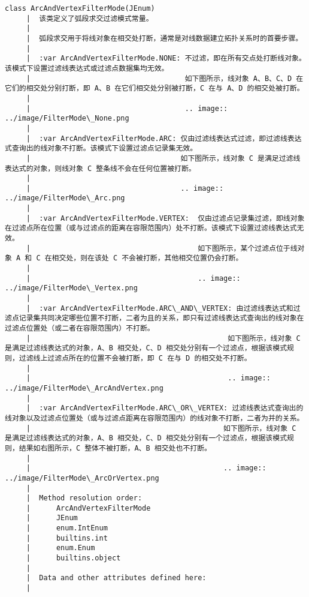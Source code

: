 \documentclass[11pt]{article}
\begin{document}
\begin{Verbatim}[commandchars=\\\{\}]
    class ArcAndVertexFilterMode(JEnum)
     |  该类定义了弧段求交过滤模式常量。
     |  
     |  弧段求交用于将线对象在相交处打断，通常是对线数据建立拓扑关系时的首要步骤。
     |  
     |  :var ArcAndVertexFilterMode.NONE: 不过滤，即在所有交点处打断线对象。该模式下设置过滤线表达式或过滤点数据集均无效。
     |                                    如下图所示，线对象 A、B、C、D 在它们的相交处分别打断，即 A、B 在它们相交处分别被打断，C 在与 A、D 的相交处被打断。
     |  
     |                                    .. image:: ../image/FilterMode\_None.png
     |  
     |  :var ArcAndVertexFilterMode.ARC: 仅由过滤线表达式过滤，即过滤线表达式查询出的线对象不打断。该模式下设置过滤点记录集无效。
     |                                   如下图所示，线对象 C 是满足过滤线表达式的对象，则线对象 C 整条线不会在任何位置被打断。
     |  
     |                                   .. image:: ../image/FilterMode\_Arc.png
     |  
     |  :var ArcAndVertexFilterMode.VERTEX:  仅由过滤点记录集过滤，即线对象在过滤点所在位置（或与过滤点的距离在容限范围内）处不打断。该模式下设置过滤线表达式无效。
     |                                       如下图所示，某个过滤点位于线对象 A 和 C 在相交处，则在该处 C 不会被打断，其他相交位置仍会打断。
     |  
     |                                       .. image:: ../image/FilterMode\_Vertex.png
     |  
     |  :var ArcAndVertexFilterMode.ARC\_AND\_VERTEX: 由过滤线表达式和过滤点记录集共同决定哪些位置不打断，二者为且的关系，即只有过滤线表达式查询出的线对象在过滤点位置处（或二者在容限范围内）不打断。
     |                                              如下图所示，线对象 C 是满足过滤线表达式的对象，A、B 相交处，C、D 相交处分别有一个过滤点，根据该模式规则，过滤线上过滤点所在的位置不会被打断，即 C 在与 D 的相交处不打断。
     |  
     |                                              .. image:: ../image/FilterMode\_ArcAndVertex.png
     |  
     |  :var ArcAndVertexFilterMode.ARC\_OR\_VERTEX: 过滤线表达式查询出的线对象以及过滤点位置处（或与过滤点距离在容限范围内）的线对象不打断，二者为并的关系。
     |                                             如下图所示，线对象 C 是满足过滤线表达式的对象，A、B 相交处，C、D 相交处分别有一个过滤点，根据该模式规则，结果如右图所示，C 整体不被打断，A、B 相交处也不打断。
     |  
     |                                             .. image:: ../image/FilterMode\_ArcOrVertex.png
     |  
     |  Method resolution order:
     |      ArcAndVertexFilterMode
     |      JEnum
     |      enum.IntEnum
     |      builtins.int
     |      enum.Enum
     |      builtins.object
     |  
     |  Data and other attributes defined here:
     |  

\end{Verbatim}
\end{document}
